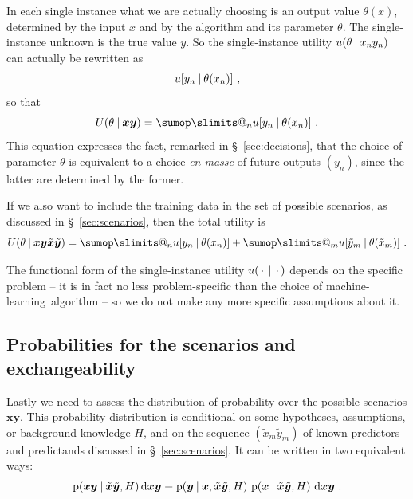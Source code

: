 \documentclass[\ifafour a4paper,12pt,\else a5paper,10pt,\fi%
onecolumn,oneside,article,%
british%
]{memoir}
\makeatletter
\theoremstyle{remark}
\theoremstyle{innote}
\def\sum{\DOTSI\sumop\slimits@}
\newcommand*{\di}{\mathrm{d}}%
\newcommand*{\dotv}{\mathord{\,\cdot\,}}%
\newcommand*{\p}{\mathrm{p}}%
\renewcommand*{\|}[1][]{\nonscript\:#1\vert\nonscript\:\mathopen{}}
\newcommand*{\sect}{\S}%
\newcommand*{\ml}{machine-learning}
\newcommand*{\xx}[1]{x_{#1}}
\newcommand*{\yy}[1]{y_{#1}}
\newcommand*{\bx}{\bm{x}}
\newcommand*{\by}{\bm{y}}
\newcommand*{\bz}{\bm{xy}}
\newcommand*{\xxx}[1]{\tilde{x}_{#1}}
\newcommand*{\yyy}[1]{\tilde{y}_{#1}}
\newcommand*{\bzz}{\tilde{\bm{x}}\tilde{\bm{y}}}
\makeatother
\begin{document}
In each single instance what we are actually choosing is an output value
$\theta(x)$, determined by the input $x$ and by the algorithm and its
parameter $\theta$. The single-instance unknown is the true value $y$. So
the single-instance utility $u(\theta \| \xx{n}\yy{n})$ can actually be
rewritten as
\begin{equation}
  \label{eq:utility_singleinstance}
  u[\yy{n} \| \theta(\xx{n})] \ ,
\end{equation}
so that
\begin{equation}
  \label{eq:total_utility_final}
  U(\theta \| \bz) = \sum_{n} u[\yy{n} \| \theta(\xx{n})] \ .
\end{equation}
This equation expresses the fact, remarked in \sect~\ref{sec:decisions},
that the choice of parameter $\theta$ is equivalent to a choice \emph{en
  masse} of future outputs $(\yy{n})$, since the latter are determined by
the former.

If we also want to include the training data in the set of possible
scenarios, as discussed in \sect~\ref{sec:scenarios}, then the total
utility is
\begin{equation}
  \label{eq:total_utility_final_withtraining}
  U(\theta \| \bz\bzz) = \sum_{n} u[\yy{n} \| \theta(\xx{n})]
 +  \sum_{m} u[\yyy{m} \| \theta(\xxx{m})] \ .
\end{equation}

The functional form of the single-instance utility $u(\dotv\|\dotv)$
depends on the specific problem -- it is in fact no less problem-specific
than the choice of \ml\ algorithm -- so we do not make any more specific
assumptions about it.

\subsection{Probabilities for the scenarios and exchangeability}
\label{sec:scenario_probabilities}

Lastly we need to assess the distribution of probability over the possible
scenarios $\bz$. This probability distribution is conditional on some
hypotheses, assumptions, or background knowledge $H$, and on the sequence
$(\xxx{m}\yyy{m})$ of known predictors and predictands discussed in
\sect~\ref{sec:scenarios}. It can be written in two equivalent ways:
\begin{equation}
  \label{eq:prob_distr_conditional}
  \p(\bz \| \bzz, H)\,\di\bz
  \equiv
  \p(\by\| \bx, \bzz, H)\ \p(\bx \| \bzz, H)\ \di\bz \ .
\end{equation}
\end{document}
